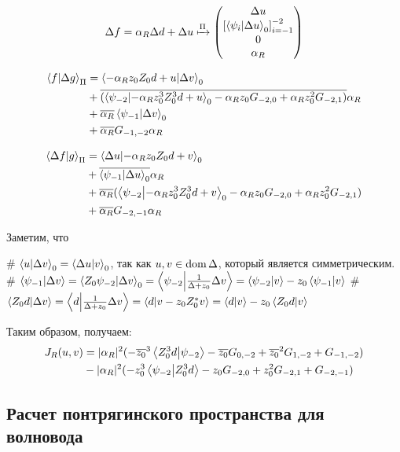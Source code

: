 \[
\Delta f = \alpha_R \Delta d + \Delta u  \xmapsto[]{\Pi}
\begin{pmatrix}
\Delta u \\
\left[ \ip{\psi_i}{\Delta u}_0\right]_{i = -1}^{-2} \\
0 \\
\alpha_R
\end{pmatrix}
\]

\begin{align*}
\ip{f}{\Delta g}_\Pi
&= \ip{- \alpha_R z_0 Z_0 d + u}{\Delta v}_0 \\
&+ \cconj{(\ip{\psi_{-2}}{- \alpha_R z_0^3 Z_0^3 d + u}_0 - \alpha_R z_0 G_{-2, 0} + \alpha_R z_0^2 G_{-2, 1})} \alpha_R \\
&+ \cconj{\alpha_R} \ip{\psi_{-1}}{\Delta v}_0 \\
&+ \cconj{\alpha_R} G_{-1, -2} \alpha_R
\end{align*}

\begin{align*}
\ip{\Delta f}{g}_\Pi
&= \ip{\Delta u}{- \alpha_R z_0 Z_0 d + v}_0 \\
&+ \cconj{\ip{\psi_{-1}}{\Delta u}_0} \alpha_R \\
&+ \cconj{\alpha_R} (\ip{\psi_{-2}}{- \alpha_R z_0^3 Z_0^3 d + v}_0 - \alpha_R z_0 G_{-2, 0} + \alpha_R z_0^2 G_{-2, 1})\\
&+ \cconj{\alpha_R} G_{-2, -1} \alpha_R
\end{align*}

Заметим, что
\begin{elist}
# $\ip{u}{\Delta v}_0 = \ip{\Delta u}{v}_0$, так как $u, v \in \operatorname{dom} \Delta$, который является симметрическим.
# $\ip{\psi_{-1}}{\Delta v} = \ip{Z_0 \psi_{-2}}{\Delta v}_0 = \ip{\psi_{-2}}{\frac{1}{\Delta + z_0} \Delta v} = \ip{\psi_{-2}}{v} - z_0 \ip{\psi_{-1}}{v}$ %
# $\ip{Z_0 d}{\Delta v} = \ip{d}{\frac{1}{\Delta + z_0} \Delta v} = \ip{d}{v - z_0 Z_0^* v} = \ip{d}{v} - z_0 \ip{Z_0 d}{v}$
\end{elist}

Таким образом, получаем:
\begin{align*}
J_R(u, v)
&= |\alpha_R|^2 (- \cconj{z_0}^3 \ip{Z_0^3 d}{\psi_{-2}} - \cconj{z_0} G_{0, -2} + \cconj{z_0}^2 G_{1, -2} + G_{-1, -2}) \\
&- |\alpha_R|^2 (- z_0^3 \ip{\psi_{-2}}{Z_0^3 d} - z_0 G_{-2, 0} + z_0^2 G_{-2, 1} + G_{-2, -1})
\end{align*}

\subsection{Расчет понтрягинского пространства для волновода}
